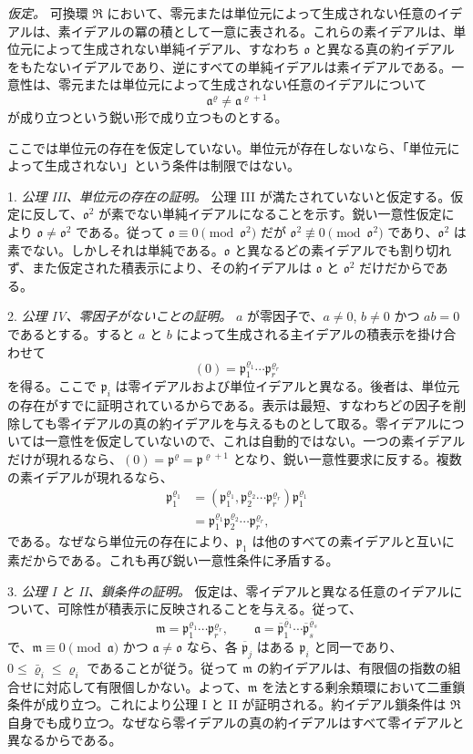 \documentclass[11pt]{article}
\providecommand{\mR}{\mathfrak{R}}
\providecommand{\mbar}[1]{\overline{#1}}
\providecommand{\ma}{\mathfrak{a}}
\providecommand{\mm}{\mathfrak{m}}
\providecommand{\mo}{\mathfrak{o}}
\providecommand{\mpideal}{\mathfrak{p}}
\begin{document}
\emph{仮定。} 可換環 $\mR$ において、零元または単位元によって生成されない任意のイデアルは、素イデアルの冪の積として一意に表される。これらの素イデアルは、単位元によって生成されない単純イデアル、すなわち $\mo$ と異なる真の約イデアルをもたないイデアルであり、逆にすべての単純イデアルは素イデアルである。一意性は、零元または単位元によって生成されない任意のイデアルについて
\[
        \ma^\varrho\ne\ma^{\varrho+1}
\]
が成り立つという鋭い形で成り立つものとする。

ここでは単位元の存在を仮定していない。単位元が存在しないなら、「単位元によって生成されない」という条件は制限ではない。

1. \emph{公理 III、単位元の存在の証明。} 公理 III が満たされていないと仮定する。仮定に反して、$\mo^2$ が素でない単純イデアルになることを示す。鋭い一意性仮定により $\mo\ne\mo^2$ である。従って $\mo\equiv0\pmod{\mo^2}$ だが $\mo^2\not\equiv0\pmod{\mo^2}$ であり、$\mo^2$ は素でない。しかしそれは単純である。$\mo$ と異なるどの素イデアルでも割り切れず、また仮定された積表示により、その約イデアルは $\mo$ と $\mo^2$ だけだからである。

2. \emph{公理 IV、零因子がないことの証明。} $a$ が零因子で、$a\ne0$, $b\ne0$ かつ $ab=0$ であるとする。すると $a$ と $b$ によって生成される主イデアルの積表示を掛け合わせて
\[
        (0)=\mpideal_1^{\varrho_1}\cdots\mpideal_r^{\varrho_r}
\]
を得る。ここで $\mpideal_i$ は零イデアルおよび単位イデアルと異なる。後者は、単位元の存在がすでに証明されているからである。表示は最短、すなわちどの因子を削除しても零イデアルの真の約イデアルを与えるものとして取る。零イデアルについては一意性を仮定していないので、これは自動的ではない。一つの素イデアルだけが現れるなら、$(0)=\mpideal^\varrho=\mpideal^{\varrho+1}$ となり、鋭い一意性要求に反する。複数の素イデアルが現れるなら、
\[
\begin{aligned}
\mpideal_1^{\varrho_1}
 &= (\mpideal_1^{\varrho_1},\mpideal_2^{\varrho_2}\cdots\mpideal_r^{\varrho_r})\mpideal_1^{\varrho_1}  \\
 &= \mpideal_1^{\varrho_1}\mpideal_2^{\varrho_2}\cdots\mpideal_r^{\varrho_r},
\end{aligned}
\]
である。なぜなら単位元の存在により、$\mpideal_1$ は他のすべての素イデアルと互いに素だからである。これも再び鋭い一意性条件に矛盾する。

3. \emph{公理 I と II、鎖条件の証明。} 仮定は、零イデアルと異なる任意のイデアルについて、可除性が積表示に反映されることを与える。従って、
\[
        \mm=\mpideal_1^{\varrho_1}\cdots\mpideal_r^{\varrho_r},
        \qquad
        \ma=\mbar\mpideal_1^{\bar\varrho_1}\cdots\mbar\mpideal_s^{\bar\varrho_s}
\]
で、$\mm\equiv0\pmod{\ma}$ かつ $\ma\ne\mo$ なら、各 $\mbar\mpideal_j$ はある $\mpideal_i$ と同一であり、$0\le\bar\varrho_i\le\varrho_i$ であることが従う。従って $\mm$ の約イデアルは、有限個の指数の組合せに対応して有限個しかない。よって、$\mm$ を法とする剰余類環において二重鎖条件が成り立つ。これにより公理 I と II が証明される。約イデアル鎖条件は $\mR$ 自身でも成り立つ。なぜなら零イデアルの真の約イデアルはすべて零イデアルと異なるからである。
\end{document}
